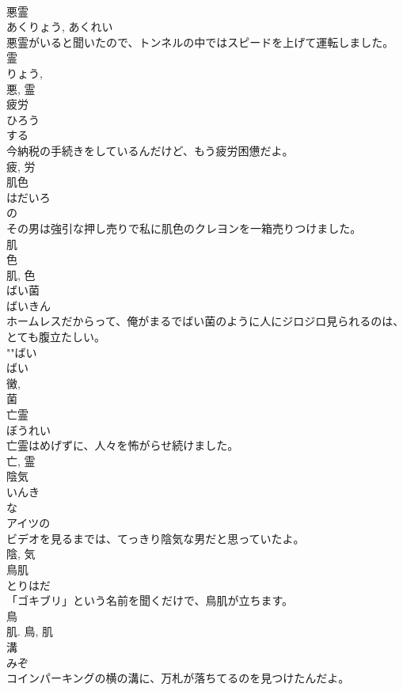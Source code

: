 \documentclass[8pt]{extreport}
\begin{document}
\begin{CJK}{UTF8}{min}
\\	悪霊	
\\	あくりょう, あくれい	
\\	悪霊がいると聞いたので、トンネルの中ではスピードを上げて運転しました。	
\\	霊 
\\	りょう, 
\\	悪, 霊	
\\	疲労	
\\	ひろう	
\\	する 
\\	今納税の手続きをしているんだけど、もう疲労困憊だよ。	
\\	疲, 労	
\\	肌色	
\\	はだいろ	
\\	の 
\\	その男は強引な押し売りで私に肌色のクレヨンを一箱売りつけました。	
\\	肌 
\\	色 
\\	肌, 色	
\\	ばい菌	
\\	ばいきん	
\\	ホームレスだからって、俺がまるでばい菌のように人にジロジロ見られるのは、とても腹立たしい。	
\\	""ばい
\\	ばい 
\\	黴, 
\\	菌	
\\	亡霊	
\\	ぼうれい	
\\	亡霊はめげずに、人々を怖がらせ続けました。	
\\	亡, 霊	
\\	陰気	
\\	いんき	
\\	な 
\\	アイツの
\\	ビデオを見るまでは、てっきり陰気な男だと思っていたよ。	
\\	陰, 気	
\\	鳥肌	
\\	とりはだ	
\\	「ゴキブリ」という名前を聞くだけで、鳥肌が立ちます。	
\\	鳥 
\\	肌.	鳥, 肌	
\\	溝	
\\	みぞ	
\\	コインパーキングの横の溝に、万札が落ちてるのを見つけたんだよ。	

\end{CJK}
\end{document}
